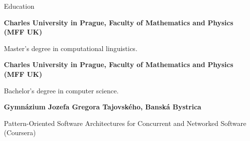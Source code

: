 \begin{rubric}{Education}

\entry*[2009 - 2012]
\textbf{Charles University in Prague, Faculty of Mathematics and Physics (MFF UK)}

\entry* 
Master's degree in computational linguistics.

\entry*[2005 - 2009]
\textbf{Charles University in Prague, Faculty of Mathematics and Physics (MFF UK)}

\entry* 
Bachelor's degree in computer science.

\entry*[2001 - 2005]
\textbf{Gymnázium Jozefa Gregora Tajovského, Banská Bystrica}

Pattern-Oriented Software Architectures for Concurrent and Networked Software (Coursera)

\end{rubric}

